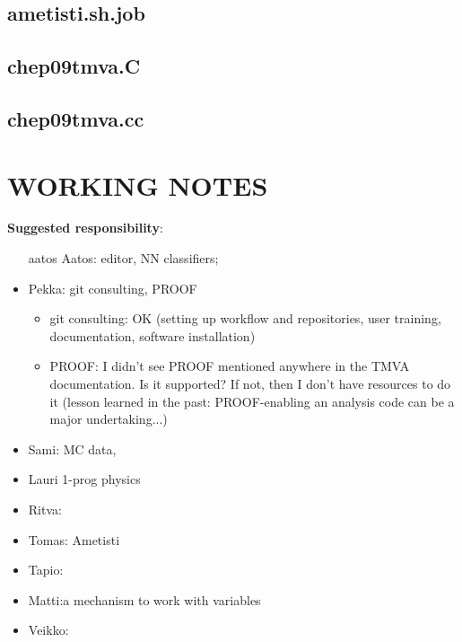\begin{appendix}
\subsection{ametisti.sh.job}


\subsection{chep09tmva.C}


\subsection{chep09tmva.cc}



\section{WORKING NOTES}
{\bf Suggested  responsibility}: 
\begin{itemize}
\item[aatos]
Aatos: editor, NN classifiers; 
\item Pekka: git consulting, PROOF
\begin{itemize}
\item git consulting: OK (setting up workflow and repositories, user
  training, documentation, software installation)
\item PROOF: I didn't see PROOF mentioned anywhere in the TMVA
  documentation. Is it supported? If not, then I don't have resources
  to do it (lesson learned in the past: PROOF-enabling an analysis
  code can be a major undertaking...)
\end{itemize}
\item Sami: MC data, 
\item Lauri 1-prog physics
\item Ritva: 
\item Tomas: Ametisti
\item Tapio: 
\item Matti:a mechanism to work with variables 
\item Veikko:
\end{itemize}

\end{appendix}
